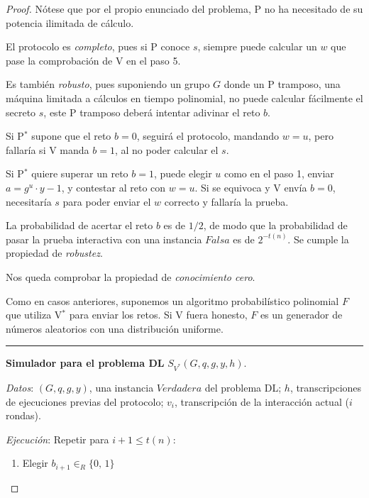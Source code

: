 \begin{proof}
	\hfil
	
	
	Nótese que por el propio enunciado del problema, P no ha necesitado de su potencia ilimitada de cálculo.
	
	\hfil
	
	El protocolo es \textit{completo}, pues si P conoce $s$, siempre puede calcular un $w$ que pase la comprobación de V en el paso 5.
	
	\hfil
	
	Es también \textit{robusto}, pues suponiendo un grupo $G$ donde un P tramposo, una máquina limitada a cálculos en tiempo polinomial, no puede calcular fácilmente el secreto $s$, este P tramposo deberá intentar adivinar el reto $b$.
	
	Si P$^*$ supone que el reto $b=0$, seguirá el protocolo, mandando $w=u$, pero fallaría si V manda $b=1$, al no poder calcular el $s$.
	
	Si P$^*$ quiere superar un reto $b=1$, puede elegir $u$ como en el paso 1, enviar $a=g^u \cdot y-1$, y contestar al reto con $w=u$. Si se equivoca y V envía $b=0$, necesitaría $s$ para poder enviar el $w$ correcto y fallaría la prueba.
	
	La probabilidad de acertar el reto $b$ es de $1/2$, de modo que la probabilidad de pasar la prueba interactiva con una instancia $Falsa$ es de $2^{-t(n)}$. Se cumple la propiedad de \textit{robustez}.
	
	
	\hfil
	
	Nos queda comprobar la propiedad de \textit{conocimiento cero}.
	
	Como en casos anteriores, suponemos un algoritmo probabilístico polinomial $F$ que utiliza V$^*$ para enviar los retos. Si V fuera honesto, $F$ es un generador de números aleatorios con una distribución uniforme.
	
	
	
	\hfil 
			
	\rule{\textwidth}{1pt}
	
	\textbf{Simulador para el problema DL} $S_{V^*}(G, q, g, y, h)$.
	
	\hfil
	
	\textit{Datos}: \quad $(G, q, g, y)$, una instancia $Verdadera$ del problema DL; \quad $h$, transcripciones de ejecuciones previas del protocolo; \quad $v_i$, transcripción de la interacción actual ($i$ rondas).
	
	\textit{Ejecución}: Repetir para $i+1 \leq t(n)$:
	
	\begin{enumerate}
		\item Elegir $b_{i+1} \in_R \{0,\,1\}$
		

\end{enumerate}
\end{proof}
